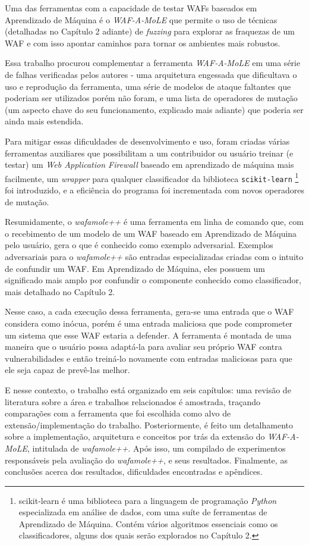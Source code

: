 Uma das ferramentas com a capacidade de testar WAFs baseados em Aprendizado de Máquina é o \textit{WAF-A-MoLE} \cite{valenza_waf--mole_2020} que permite o uso de técnicas (detalhadas no Capítulo 2 adiante) de \textit{fuzzing} \cite{fuzzing_book} para explorar as fraquezas de um WAF e com isso apontar caminhos para tornar os ambientes mais robustos.

Essa trabalho procurou complementar a ferramenta \textit{WAF-A-MoLE} em uma série de falhas verificadas pelos autores - uma arquitetura engessada que dificultava o uso e reprodução da ferramenta, uma série de modelos de ataque faltantes que poderiam ser utilizados porém não foram, e uma lista de operadores de mutação (um aspecto chave do seu funcionamento, explicado mais adiante) que poderia ser ainda mais estendida. 

Para mitigar essas dificuldades de desenvolvimento e uso, foram criadas várias ferramentas auxiliares que possibilitam a um contribuidor ou usuário treinar (e testar) um \textit{Web Application Firewall} baseado em aprendizado de máquina mais facilmente, um \textit{wrapper} para qualquer classificador da biblioteca \verb+scikit-learn+ \footnote{scikit-learn é uma biblioteca para a linguagem de programação \textit{Python} especializada em análise de dados, com uma suíte de ferramentas de Aprendizado de Máquina. Contém vários algoritmos essenciais como os classificadores, alguns dos quais serão explorados no Capítulo 2.} foi introduzido, e a eficiência do programa foi incrementada com novos operadores de mutação.

Resumidamente, o \textit{wafamole++} é uma ferramenta em linha de comando que, com o recebimento de um modelo de um WAF baseado em Aprendizado de Máquina pelo usuário, gera o que é conhecido como exemplo adversarial. Exemplos adversariais para o \textit{wafamole++} são entradas especializadas criadas com o intuito de confundir um WAF. Em Aprendizado de Máquina, eles possuem um significado mais amplo por confundir o componente conhecido como classificador, mais detalhado no Capítulo 2.

Nesse caso, a cada execução dessa ferramenta, gera-se uma entrada que o WAF considera como inócua, porém é uma entrada maliciosa que pode comprometer um sistema que esse WAF estaria a defender. A ferramenta é montada de uma maneira que o usuário possa adaptá-la para avaliar seu próprio WAF contra vulnerabilidades e então treiná-lo novamente com entradas maliciosas para que ele seja capaz de prevê-las melhor.

E nesse contexto, o trabalho está organizado em seis capítulos: uma revisão de literatura sobre a área e trabalhos relacionados é amostrada, traçando comparações com a ferramenta que foi escolhida como alvo de extensão/implementação do trabalho. Posteriormente, é feito um detalhamento sobre a implementação, arquitetura e conceitos por trás da extensão do \textit{WAF-A-MoLE}, intitulada de \textit{wafamole++}. Após isso, um compilado de experimentos responsáveis pela avaliação do \textit{wafamole++}, e seus resultados. Finalmente, as conclusões acerca dos resultados, dificuldades encontradas e apêndices.

\bigskip
